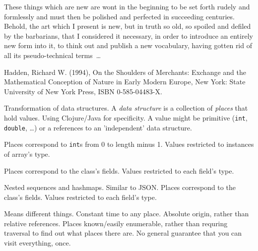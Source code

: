 \setcounter{currentlevel}{\value{baseSectionLevel}}
\epigraph{These things which are new are wont in the beginning to 
be set 
forth rudely and formlessly and must then be polished and 
perfected in succeeding centuries. Behold, the art which I present 
is new, but in truth so old, so spoiled and defiled by the 
barbarians, that I considered it necessary, in order to introduce
an entirely new form into it, to think out and publish a new 
vocabulary, having gotten rid of all its pseudo-technical 
terms~\ldots}
{Hadden, Richard W. (1994), On the Shoulders of Merchants: 
Exchange and the Mathematical Conception of Nature in Early 
Modern Europe, New York: State University of New York Press, 
ISBN 0-585-04483-X.}
Transformation of data structures.
A \textit{data structure} is a collection of \textit{places}
that hold values. 
Using Clojure/Java for specificity.
A value might be primitive
(\texttt{int}, \texttt{double}, \ldots)
or a references to an 'independent' data structure.

\begin{example}
Places correspond to \texttt{int}s from 0 to length minus 1.
Values restricted to instances of array's type.
\end{example}  

\begin{example}
Places correspond to the class's fields.
Values restricted to each field's type.
\end{example}  

\begin{example}
Nested sequences and hashmaps. Similar to JSON.
Places correspond to the class's fields.
Values restricted to each field's type.
\end{example}  


Means different things. 
Constant time to any place.
Absolute origin, rather than relative references.
Places known/easily enumerable, rather than requring traversal
to find out what places there are.
No general guarantee that you can visit everything, once.

